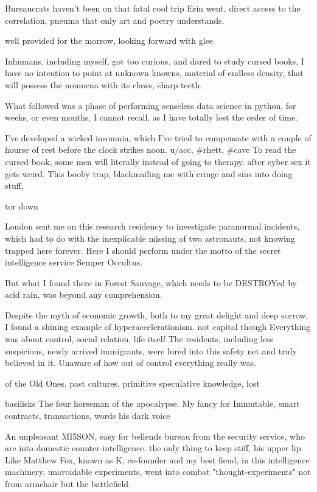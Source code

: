 \documentclass{article}
\begin{document}
Bureaucrats haven't been on that fatal  cool trip Erin went,
direct access to the correlation, 
pneuma that only art and poetry understands. 

well provided for the morrow, looking forward with glee


Inhumans, including myself, got too curious, and dared to study cursed books,
I have no intention to point at unknown knowns, 
material of endless density,
that will possess the noumena with its claws, sharp teeth. 

What followed was a phase of performing senseless data science in python, 
for weeks, or even months, I cannot recall,  
as I have totally lost the order of time.

I've developed a wicked insomnia, which I've tried to compensate with a couple of hourse of rest before the clock strikes noon. 
u/acc, \#rhett, \#cave
To read the cursed book, some men will literally instead of going to therapy.
after cyber sex it gets weird.
This booby trap, blackmailing me with cringe and sins into doing stuff,

tor down


London sent me on this research residency to investigate paranormal incidents, 
which had to do with the inexplicable missing of two astronauts, not knowing
trapped here forever.
Here I should perform under the motto of the secret intelligence service  
Semper Occultus. 

But what I found there in Forest Sauvage, which needs to be DESTROYed by acid rain, 
was beyond any comprehension.

Despite the myth of economic growth, 
both to my great delight and deep sorrow, 
I found a shining example of hyperaccelerationism.
not capital though
Everything was about control, social relation, 
life itself
The residents, including less suspicious, newly arrived immigrants,
were lured into this safety net and truly believed in it. 
Unaware of how out of control everything really was. 


of the Old Ones, past cultures, primitive speculative knowledge, 
lost

basilisks
The four horseman of the apocalypse. 
My fancy for 
Immutable, smart contracts, transactions, words
his dark voice 


An unpleasant MI5SON, easy for bellends 
bureau from the security service, who are into domestic counter-intelligence. 
the only thing to keep stiff, his upper lip.
Like Matthew Fox, known as K, co-founder and my best fiend, in this intelligence machinery. 
unavoidable experiments, went into combat
"thought-experiments" not from armchair but the battlefield.
\end{document}
